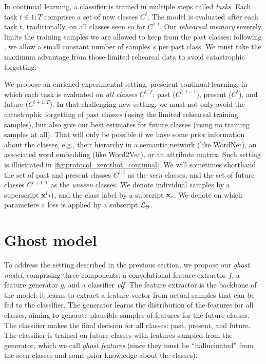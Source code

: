 In continual learning, a classifier is trained in multiple steps called \textit{tasks}. Each task
$t\in{1:T}$ comprises a set of new classes $C^t$. The model is evaluated after each task $t$,
traditionally, on all classes seen so far $C^{1:t}$. Our \textit{rehearsal memory} severely limits
the training samples we are allowed to keep from the past classes: following
\cite{hou2019ucir,douillard2020podnet}, we allow a small constant number of samples $s$ per past
class. We must take the maximum advantage from those limited rehearsal data to avoid catastrophic
forgetting.

We propose an enriched experimental setting, prescient continual learning, in which each task is
evaluated on \textit{all classes} $C^{1:T}$: past ($C^{1:t-1}$), present ($C^t$), and future
($C^{t+1:T}$). In that challenging new setting, we must not only avoid the catastrophic forgetting
of past classes (using the limited rehearsal training samples), but also give our best estimates for
future classes (using no training samples at all). That will only be possible if we have some prior
information about the classes, e.g., their hierarchy in a semantic network (like WordNet), an
associated word embedding (like Word2Vec), or an attribute matrix. Such setting is illustrated in
\autoref{fig:protocol_zeroshot_continual}. We will sometimes shorthand the set of past and present
classes $C^{1:t}$ as the \textit{seen} classes, and the set of future classes $C^{t+1:T}$ as the
\textit{unseen} classes. We denote individual samples by a superscript $\mathbf{x}^(i)$, and the class
label by a subscript $\mathbf{x}_c$. We denote on which parameters a loss is applied by a subscript
$\mathcal{L}_\Theta$.

\section{Ghost model}
\label{sec:model}

To address the setting described in the previous section, we propose our \textit{ghost model},
comprising three components: a convolutional feature extractor $f$, a feature generator $g$, and a
classifier $\textit{clf}$. The feature extractor is the backbone of the model: it learns to extract a
feature vector from actual samples that can be fed to the classifier. The generator learns the
distribution of the features for all classes, aiming to generate plausible samples of features for
the future classes. The classifier makes the final decision for all classes: past, present, and
future. The classifier is trained on future classes with features sampled from the generator, which
we call \textit{ghost features} (since they must be “hallucinated” from the seen classes and some
prior knowledge about the classes).

